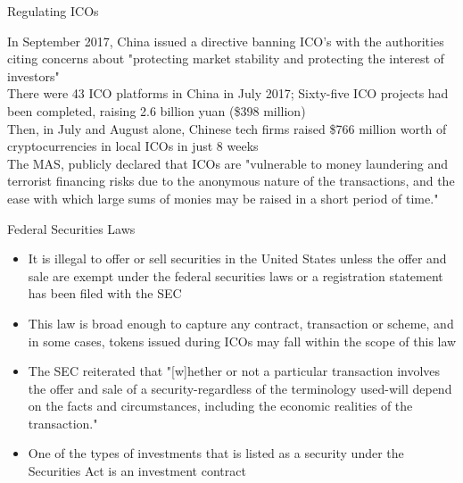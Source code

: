 \documentclass[10pt]{beamer}
\begin{document}
\begin{frame}{Regulating ICOs}
	\begin{small}
		In September 2017, China issued a directive banning ICO's with the authorities citing concerns about "protecting market stability and protecting the interest of investors"\\ \vspace{3mm}
		There were 43 ICO platforms in China in July 2017; Sixty-five ICO projects had been completed, raising 2.6 billion yuan (\$398 million) \\ \vspace{3mm}
		Then, in July and August alone, Chinese tech firms raised \$766 million worth of cryptocurrencies in local ICOs in just 8 weeks \\ \vspace{3mm}
		The MAS, publicly declared that ICOs are "vulnerable to money laundering and terrorist financing risks due to the anonymous nature of the transactions, and the ease with which large sums of monies may be raised in a short period of time."\\ \vspace{3mm}
	\end{small}
\end{frame}


\begin{frame}{Federal Securities Laws}
	\begin{itemize}
		\item It is illegal to offer or sell securities in the United States unless the offer and sale are exempt under the federal securities laws or a registration statement has been filed with the SEC
		\item This law is broad enough to capture any contract, transaction or scheme, and in some cases, tokens issued during ICOs may fall within the scope of this law
		\item The SEC reiterated that "[w]hether or not a particular transaction involves the offer and sale of a security-regardless of the terminology used-will depend on the facts and circumstances, including the economic realities of the transaction."
		\item One of the types of investments that is listed as a security under the Securities Act is an investment contract
	\end{itemize}
\end{frame}
\end{document}
